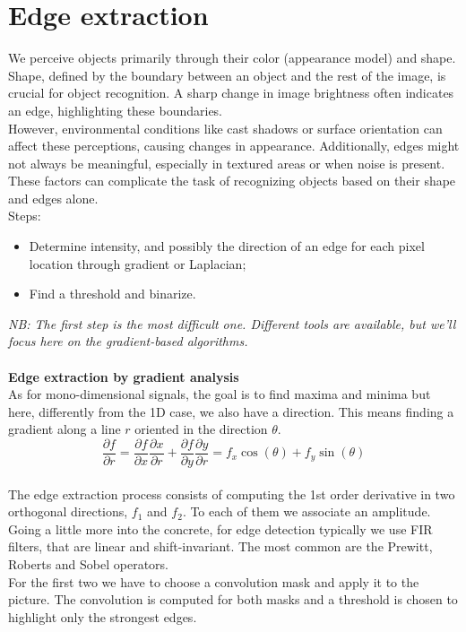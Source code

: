 \section{Edge extraction}
We perceive objects primarily through their color (appearance model) and shape. Shape, defined by the boundary between an object and the rest of the image, is crucial for object recognition. A sharp change in image brightness often indicates an edge, highlighting these boundaries.
\\
However, environmental conditions like cast shadows or surface orientation can affect these perceptions, causing changes in appearance. Additionally, edges might not always be meaningful, especially in textured areas or when noise is present. These factors can complicate the task of recognizing objects based on their shape and edges alone.
\\Steps:
\begin{itemize}
    \item Determine intensity, and possibly the direction of an edge for each pixel location through gradient or Laplacian;
    \item Find a threshold and binarize.
\end{itemize}
\textit{NB: The first step is the most difficult one. Different tools are available, but we’ll focus here on the gradient-based algorithms.}
\\\\
\textbf{Edge extraction by gradient analysis}\\
As for mono-dimensional signals, the goal is to find maxima and minima but here, differently from the 1D case, we also have a direction. This means finding a gradient along a line $r$ oriented in the direction $\theta$.
\[
\frac{\partial f}{\partial r} = \frac{\partial f}{\partial x}\frac{\partial x}{\partial r} + \frac{\partial f}{\partial y} \frac{\partial y}{\partial r} = f_x \cos(\theta) + f_y \sin(\theta)
\]
\\
The edge extraction process consists of computing the 1st order derivative in two orthogonal directions, $f_1$ and $f_2$. To each of them we associate an amplitude.
Going a little more into the concrete, for edge detection typically we use FIR filters, that are linear and shift-invariant. The most common are the Prewitt, Roberts and Sobel operators.
\\
For the first two we have to choose a convolution mask and apply it to the picture. The convolution is computed for both masks and a threshold is chosen to highlight only the strongest edges.
